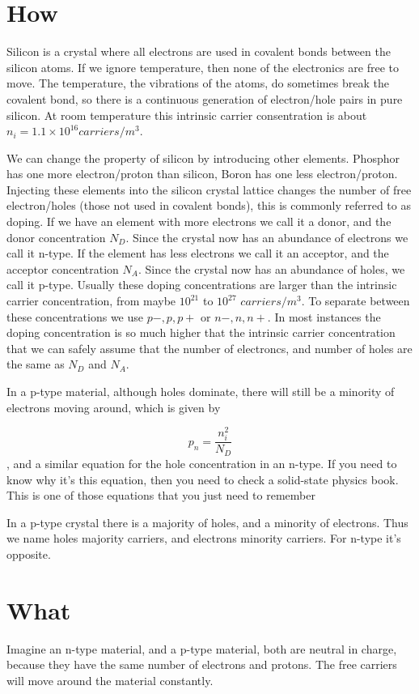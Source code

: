 \documentclass[technote,10pt,a4paper]{IEEEtran}
\newcommand{\eqn}[1]{
  \begin{equation}
    #1
  \end{equation}}
\begin{document}
\section{How}
Silicon is a crystal where all electrons are used in covalent bonds between the
silicon atoms. If we ignore temperature, then none of the electronics are
free to move. The temperature, the vibrations of the atoms, do sometimes
break the covalent bond, so there is a continuous generation of electron/hole
pairs in pure silicon. At room temperature this intrinsic carrier consentration is about
$ n_{i} =  1.1 \times 10^{16} carriers/m^3$.

We can change the property of silicon by introducing other elements. Phosphor
has one more electron/proton than silicon, Boron has one less electron/proton.
Injecting these elements into the silicon crystal lattice changes the number of
free electron/holes (those not used in covalent bonds), this is commonly
referred to as doping. If we have an element
with more electrons we call it a donor, and the donor concentration $N_{D}$.
Since the crystal now has an abundance of electrons we call it n-type.
If the element has less electrons we call it an acceptor, and the acceptor
concentration $N_{A}$. Since the crystal now has an abundance of holes, we
call it p-type. Usually these doping concentrations are larger than the
intrinsic carrier concentration, from maybe $10^{21}$ to $10^{27}$
$carriers/m^{3}$. To separate between these concentrations we use $p-,p,p+$ or
$n-, n, n+$. In most instances the doping concentration is so much higher that
the intrinsic carrier concentration that we can safely assume that the number of
electroncs, and number of holes are the same as $N_{D}$ and $N_{A}$.

In a p-type material, although holes dominate, there will still be a minority of
electrons moving around, which is given by
\eqn{p_{n} = \frac{n_{i}^{2}}{N_{D}}}
, and a similar equation for the hole concentration in an n-type.
If you need to know why it's this equation, then you need to check a solid-state
physics book. This is one of those equations that you just need to remember

In a p-type crystal there is a majority of holes, and a minority of electrons.
Thus we name holes majority carriers, and electrons minority carriers. For
n-type it's opposite.

\section{What}
Imagine an n-type material, and a p-type material, both are neutral in charge,
because they have the same number of electrons and protons. The free carriers
will move around the material constantly.
\end{document}
